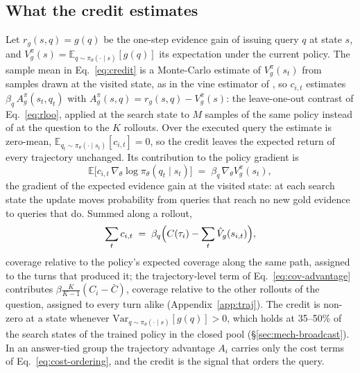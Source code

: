 \subsection{What the credit estimates}
\label{sec:method-estimate}

Let $r_g(s,q)=g(q)$ be the one-step evidence gain of issuing query $q$
at state $s$, and $V^\pi_g(s)=\mathbb{E}_{q\sim\pi_\theta(\cdot\mid
s)}[g(q)]$ its expectation under the current policy. The sample mean in
Eq.~\ref{eq:credit} is a Monte-Carlo estimate of $V^\pi_g(s_t)$ from
samples drawn at the visited state, as in the vine estimator of
\citet{schulman2015trpo}, so $c_{i,t}$ estimates $\beta_q\,A^\pi_g(s_t,q_t)$
with $A^\pi_g(s,q)=r_g(s,q)-V^\pi_g(s)$: the leave-one-out contrast of
Eq.~\ref{eq:rloo}, applied at the search state to $M$ samples of the
same policy instead of at the question to the $K$ rollouts. Over the
executed query the estimate is zero-mean,
$\mathbb{E}_{q_t\sim\pi_\theta(\cdot\mid s_t)}[c_{i,t}]=0$, so the credit
leaves the expected return of every trajectory unchanged. Its
contribution to the policy gradient is
\begin{equation}
\mathbb{E}\bigl[c_{i,t}\,\nabla_\theta\log\pi_\theta(q_t\mid s_t)\bigr]
\;=\;\beta_q\,\nabla_\theta V^\pi_g(s_t),
\label{eq:credit-grad}
\end{equation}
the gradient of the expected evidence gain at the visited state: at
each search state the update moves probability from queries that reach
no new gold evidence to queries that do. Summed along a rollout,
\begin{equation}
\sum_t c_{i,t} \;=\; \beta_q\Bigl(C(\tau_i)-\sum_t \hat V_g(s_{i,t})\Bigr),
\label{eq:credit-sum}
\end{equation}
coverage relative to the policy's expected coverage along the same
path, assigned to the turns that produced it; the trajectory-level term
of Eq.~\ref{eq:cov-advantage} contributes
$\beta\tfrac{K}{K-1}(C_i-\bar C)$, coverage relative to the other
rollouts of the question, assigned to every turn alike
(Appendix~\ref{app:traj}). The credit is non-zero at a state whenever
$\mathrm{Var}_{q\sim\pi_\theta(\cdot\mid s)}[g(q)]>0$, which holds at
35--50\% of the search states of the trained policy in the closed pool
(\S\ref{sec:mech-broadcast}). In an answer-tied group the trajectory
advantage $A_i$ carries only the cost terms of
Eq.~\ref{eq:cost-ordering}, and the credit is the signal that orders
the query.


